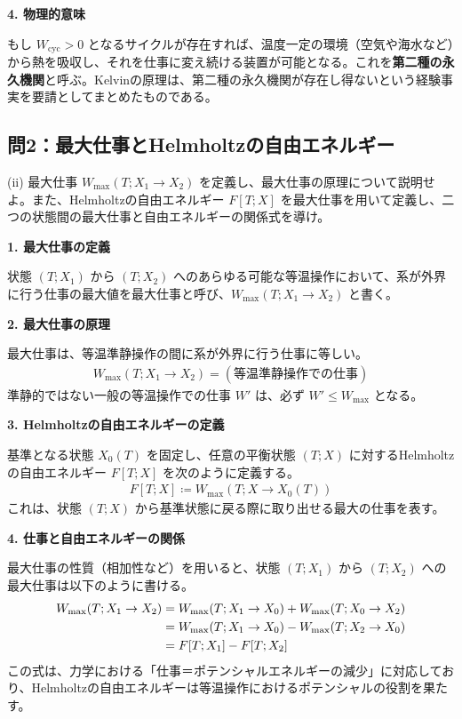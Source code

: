 \documentclass[a4paper,12pt]{jlreq}
\begin{document}
\textbf{4. 物理的意味} \par
もし $W_{\text{cyc}} > 0$ となるサイクルが存在すれば、温度一定の環境（空気や海水など）から熱を吸収し、それを仕事に変え続ける装置が可能となる。これを\textbf{第二種の永久機関}と呼ぶ。Kelvinの原理は、第二種の永久機関が存在し得ないという経験事実を要請としてまとめたものである。

\vspace{10mm}

\subsection*{問2：最大仕事とHelmholtzの自由エネルギー}

\begin{itembox}[l]{(ii)}
  最大仕事 $W_{\max}(T; X_1 \to X_2)$ を定義し、最大仕事の原理について説明せよ。また、Helmholtzの自由エネルギー $F[T; X]$ を最大仕事を用いて定義し、二つの状態間の最大仕事と自由エネルギーの関係式を導け。
\end{itembox}

\vspace{5mm}

\par
\textbf{1. 最大仕事の定義} \par
状態 $(T; X_1)$ から $(T; X_2)$ へのあらゆる可能な等温操作において、系が外界に行う仕事の最大値を最大仕事と呼び、$W_{\max}(T; X_1 \to X_2)$ と書く。

\textbf{2. 最大仕事の原理} \par
最大仕事は、等温準静操作の間に系が外界に行う仕事に等しい。
\begin{align}
  W_{\max}(T; X_1 \to X_2) = (\text{等温準静操作での仕事})
\end{align}
準静的ではない一般の等温操作での仕事 $W'$ は、必ず $W' \le W_{\max}$ となる。

\textbf{3. Helmholtzの自由エネルギーの定義} \par
基準となる状態 $X_0(T)$ を固定し、任意の平衡状態 $(T; X)$ に対するHelmholtzの自由エネルギー $F[T; X]$ を次のように定義する。
\begin{align}
  F[T; X] \coloneqq W_{\max}(T; X \to X_0(T))
\end{align}
これは、状態 $(T; X)$ から基準状態に戻る際に取り出せる最大の仕事を表す。

\textbf{4. 仕事と自由エネルギーの関係} \par
最大仕事の性質（相加性など）を用いると、状態 $(T; X_1)$ から $(T; X_2)$ への最大仕事は以下のように書ける。
\begin{align}
  W_{\max}(T; X_1 \to X_2) &= W_{\max}(T; X_1 \to X_0) + W_{\max}(T; X_0 \to X_2) \notag \\
  &= W_{\max}(T; X_1 \to X_0) - W_{\max}(T; X_2 \to X_0) \notag \\
  &= F[T; X_1] - F[T; X_2]
\end{align}
この式は、力学における「仕事＝ポテンシャルエネルギーの減少」に対応しており、Helmholtzの自由エネルギーは等温操作におけるポテンシャルの役割を果たす。
\end{document}
